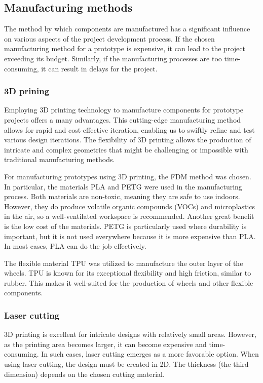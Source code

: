 \documentclass[../report.tex]{subfiles}
\begin{document}
\subsection{Manufacturing methods}
    The method by which components are manufactured has a significant influence
    on various aspects of the project development process. If the chosen
    manufacturing method for a prototype is expensive, it can lead to the
    project exceeding its budget. Similarly, if the manufacturing processes are
    too time-consuming, it can result in delays for the project.
\subsubsection{3D prining}
    Employing 3D printing technology to manufacture components for prototype
    projects offers a many advantages. This cutting-edge manufacturing method
    allows for rapid and cost-effective iteration, enabling us to swiftly refine
    and test various design iterations. The flexibility of 3D printing allows the
    production of intricate and complex geometries that might be challenging or
    impossible with traditional manufacturing methods.

    For manufacturing prototypes using 3D printing, the FDM method was chosen.
    In particular, the materials PLA and PETG were used in the manufacturing
    process. Both materials are non-toxic, meaning they are safe to use
    indoors. However, they do produce volatile organic compounds (VOCs) and
    microplastics in the air, so a well-ventilated workspace is recommended.
    Another great benefit is the low cost of the materials. PETG is particularly
    used where durability is important, but it is not used everywhere because
    it is more expensive than PLA. In most cases, PLA can do the job
    effectively.

    The flexible material TPU was utilized to manufacture the outer layer of
    the wheels. TPU is known for its exceptional flexibility and high friction,
    similar to rubber. This makes it well-suited for the production of wheels
    and other flexible components.
\subsubsection{Laser cutting}
    3D printing is excellent for intricate designs with relatively small areas.
    However, as the printing area becomes larger, it can become expensive and
    time-consuming. In such cases, laser cutting emerges as a more favorable
    option. When using laser cutting, the design must be created in 2D. The
    thickness (the third dimension) depends on the chosen cutting material.
\end{document}
